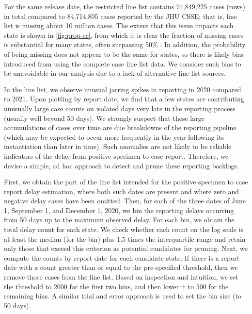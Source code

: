 For the same release date, the restricted line list contains 74,849,225 cases
(rows) in total compared to 84,714,805 cases reported by the JHU CSSE; that is,
line list is missing about 10 million cases. The extent that this issue impacts
each state is shown in \autoref{fig:prop-cc}, from which it is clear
the fraction of missing cases is substantial for many states, often surpassing
50\% \citep{jahja2022real}. In addition, the probability of being missing does
not appear to be the same for states, so there is likely bias introduced from
using the complete case line list data. We consider such bias to be unavoidable
in our analysis due to a lack of alternative line list sources.

In the line list, we observe unusual jarring spikes in reporting in 2020
compared to 2021. Upon plotting by report date, we find that a few states are
contributing unusually large case counts on isolated days very late in the
reporting process (usually well beyond 50 days). We strongly suspect that these
large accumulations of cases over time are due breakdowns of the reporting
pipeline (which may be expected to occur more frequently in the year following
its instantiation than later in time). Such anomalies are not likely to be
reliable indicators of the delay from positive specimen to case report.
Therefore, we devise a simple, ad hoc approach to detect and prune these
reporting backlogs.

First, we obtain the part of the line list intended for the positive specimen to
case report delay estimation, where both such dates are present and where zero
and negative delay cases have been omitted. Then, for each of the three dates of
June 1, September 1, and December 1, 2020, we bin the reporting delays occurring
from 50 days up to the maximum observed delay. For each bin, we obtain the total
delay count for each state. We check whether each count on the log scale is at
least the median (for the bin) plus 1.5 times the interquartile range and retain
only those that exceed this criterion as potential candidates for pruning. Next,
we compute the counts by report date for each candidate state. If there is a
report date with a count greater than or equal to the pre-specified threshold,
then we remove those cases from the line list. Based on inspection and
intuition, we set the threshold to 2000 for the first two bins, and then lower
it to 500 for the remaining bins. A similar trial and error approach is used to
set the bin size (to 50 days).

